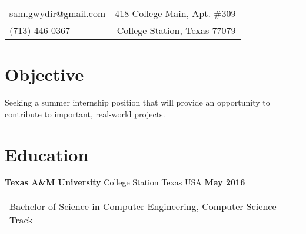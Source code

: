\documentclass[margin,line,12pt]{res}
\newenvironment{list1}{
\begin{list}{\ding{113}}{%
  \setlength{\itemsep}{0in}
  \setlength{\parsep}{0in} \setlength{\parskip}{0in}
  \setlength{\topsep}{0in} \setlength{\partopsep}{0in}
  \setlength{\leftmargin}{0.17in}}}{\end{list}}
\begin{document}
\hfill
\vspace*{-.45in}
\begin{tabular}{l r}
sam.gwydir@gmail.com & 418 College Main, Apt. \#309\\
(713) 446-0367 & College Station, Texas 77079
\end{tabular}

\vspace*{.1in}
{\color{Black}
\begin{resume}

{\color{Black}
  \section{\sc Objective}}
Seeking a summer internship position that will provide an opportunity to
contribute to important, real-world projects.

\color{black}
{\color{Black}
  \vspace{-.1in}
  \section{\sc Education}}

{\bf Texas A\&M University} College Station Texas USA \hfill {\bf May 2016} \ \\
\vspace*{-.17in}
\begin{tabular}{l l l}
  Bachelor of Science in Computer Engineering, Computer Science Track \\
\end{tabular}


\end{resume}}
\end{document}
